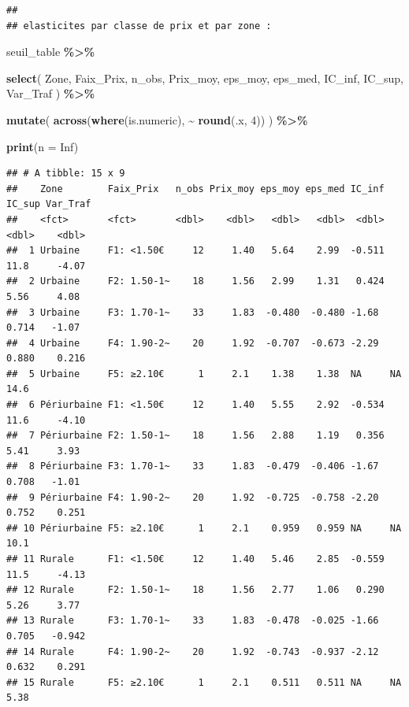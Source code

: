 \documentclass[
]{article}
\newenvironment{Shaded}{\begin{snugshade}}{\end{snugshade}}
\newcommand{\AttributeTok}[1]{\textcolor[rgb]{0.13,0.29,0.53}{#1}}
\newcommand{\ConstantTok}[1]{\textcolor[rgb]{0.56,0.35,0.01}{#1}}
\newcommand{\DecValTok}[1]{\textcolor[rgb]{0.00,0.00,0.81}{#1}}
\newcommand{\FunctionTok}[1]{\textcolor[rgb]{0.13,0.29,0.53}{\textbf{#1}}}
\newcommand{\NormalTok}[1]{#1}
\newcommand{\SpecialCharTok}[1]{\textcolor[rgb]{0.81,0.36,0.00}{\textbf{#1}}}
\begin{document}
\begin{verbatim}
## 
## elasticites par classe de prix et par zone :
\end{verbatim}

\begin{Shaded}
\begin{Highlighting}[]
\NormalTok{seuil\_table }\SpecialCharTok{\%\textgreater{}\%}

  \FunctionTok{select}\NormalTok{(}
\NormalTok{    Zone,}
\NormalTok{    Faix\_Prix,}
\NormalTok{    n\_obs,}
\NormalTok{    Prix\_moy,}
\NormalTok{    eps\_moy,}
\NormalTok{    eps\_med,}
\NormalTok{    IC\_inf,}
\NormalTok{    IC\_sup,}
\NormalTok{    Var\_Traf}
\NormalTok{  ) }\SpecialCharTok{\%\textgreater{}\%}

  \FunctionTok{mutate}\NormalTok{(}
    \FunctionTok{across}\NormalTok{(}\FunctionTok{where}\NormalTok{(is.numeric), }\SpecialCharTok{\textasciitilde{}} \FunctionTok{round}\NormalTok{(.x, }\DecValTok{4}\NormalTok{))}
\NormalTok{  ) }\SpecialCharTok{\%\textgreater{}\%}

  \FunctionTok{print}\NormalTok{(}\AttributeTok{n =} \ConstantTok{Inf}\NormalTok{)}
\end{Highlighting}
\end{Shaded}

\begin{verbatim}
## # A tibble: 15 x 9
##    Zone        Faix_Prix   n_obs Prix_moy eps_moy eps_med IC_inf IC_sup Var_Traf
##    <fct>       <fct>       <dbl>    <dbl>   <dbl>   <dbl>  <dbl>  <dbl>    <dbl>
##  1 Urbaine     F1: <1.50€     12     1.40   5.64    2.99  -0.511 11.8     -4.07 
##  2 Urbaine     F2: 1.50-1~    18     1.56   2.99    1.31   0.424  5.56     4.08 
##  3 Urbaine     F3: 1.70-1~    33     1.83  -0.480  -0.480 -1.68   0.714   -1.07 
##  4 Urbaine     F4: 1.90-2~    20     1.92  -0.707  -0.673 -2.29   0.880    0.216
##  5 Urbaine     F5: ≥2.10€      1     2.1    1.38    1.38  NA     NA       14.6  
##  6 Périurbaine F1: <1.50€     12     1.40   5.55    2.92  -0.534 11.6     -4.10 
##  7 Périurbaine F2: 1.50-1~    18     1.56   2.88    1.19   0.356  5.41     3.93 
##  8 Périurbaine F3: 1.70-1~    33     1.83  -0.479  -0.406 -1.67   0.708   -1.01 
##  9 Périurbaine F4: 1.90-2~    20     1.92  -0.725  -0.758 -2.20   0.752    0.251
## 10 Périurbaine F5: ≥2.10€      1     2.1    0.959   0.959 NA     NA       10.1  
## 11 Rurale      F1: <1.50€     12     1.40   5.46    2.85  -0.559 11.5     -4.13 
## 12 Rurale      F2: 1.50-1~    18     1.56   2.77    1.06   0.290  5.26     3.77 
## 13 Rurale      F3: 1.70-1~    33     1.83  -0.478  -0.025 -1.66   0.705   -0.942
## 14 Rurale      F4: 1.90-2~    20     1.92  -0.743  -0.937 -2.12   0.632    0.291
## 15 Rurale      F5: ≥2.10€      1     2.1    0.511   0.511 NA     NA        5.38
\end{verbatim}
\end{document}
